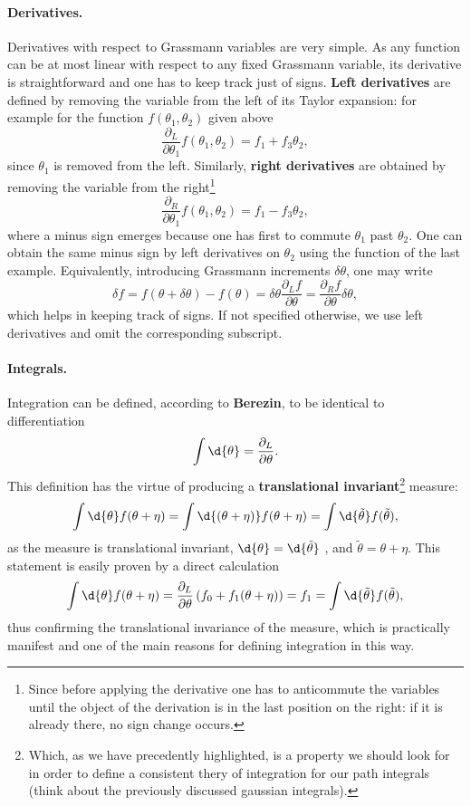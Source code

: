 \paragraph{Derivatives.}
Derivatives with respect to Grassmann variables are very simple. As any function can be at most linear with respect to any fixed Grassmann variable, its derivative is straightforward and one has to keep track just of signs. \textbf{Left derivatives} are defined by removing the variable from the left of its Taylor expansion: for example for the function \(f(\theta_1, \theta_2)\) given above
\[
    \frac{\partial_L}{\partial \theta_1} f(\theta_1, \theta_2) = f_1 + f_3 \theta_2,
\]
since \(\theta_1\) is removed from the left. Similarly, \textbf{right derivatives} are obtained by removing the variable from the right\footnote{Since before applying the derivative one has to anticommute the variables until the object of the derivation is in the last position on the right: if it is already there, no sign change occurs.}
\[
    \frac{\partial_R}{\partial \theta_1} f(\theta_1, \theta_2) = f_1 - f_3 \theta_2,
\]
where a minus sign emerges because one has first to commute \(\theta_1\) past \(\theta_2\). One can obtain the same minus sign by left derivatives on \(\theta_2\) using the function of the last example. Equivalently, introducing Grassmann increments \(\delta \theta\), one may write
\[
    \delta f = f(\theta + \delta \theta) - f(\theta) = \delta \theta \frac{\partial_L f}{\partial \theta} = \frac{\partial_R f}{\partial \theta} \delta \theta,
\]
which helps in keeping track of signs. If not specified otherwise, we use left derivatives and omit the corresponding subscript.

\paragraph{Integrals.}
Integration can be defined, according to \textbf{Berezin}, to be identical to differentiation
\[
    \int \d{\theta} = \frac{\partial_L}{\partial \theta}.
\]
This definition has the virtue of producing a \textbf{translational invariant}\footnote{Which, as we have precedently highlighted, is a property we should look for in order to define a consistent thery of integration for our path integrals (think about the previously discussed gaussian integrals).} measure:
\[
    \int \d{\theta} f(\theta + \eta) = \int \d{(\theta + \eta)} f(\theta + \eta) = \int \d{\tilde{\theta}} f(\tilde{\theta}),
\]
as the measure is translational invariant, \(\d{\theta} = \d{\tilde{\theta}}\) , and \(\tilde{\theta} = \theta + \eta\). This statement is easily proven by a direct calculation
\[
    \int \d{\theta} f(\theta + \eta) = \frac{\partial_L}{\partial \theta} \left( f_0 + f_1 (\theta + \eta) \right) = f_1 = \int \d{\tilde{\theta}} f(\tilde{\theta}),
\]
thus confirming the translational invariance of the measure, which is practically manifest and one of the main reasons for defining integration in this way.

